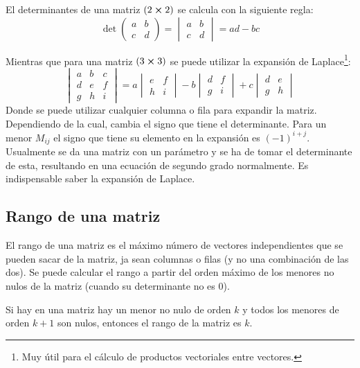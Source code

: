 \documentclass[arial,a4paper,print]{article}
\begin{document}
El determinantes de una matriz $(2\cross2)$ se calcula con la siguiente regla:
\begin{equation*}
	\det \begin{pmatrix} a & b \\
		c & d \end{pmatrix} = 
	\begin{vmatrix} a & b \\
		c & d \end{vmatrix} = ad - bc
\end{equation*}

Mientras que para una matriz $(3\cross3)$ se puede utilizar la expansión de Laplace\footnote{Muy útil para el cálculo de productos vectoriales entre vectores.}:
\begin{equation*}
	\begin{vmatrix}a&b&c\\ d&e&f\\ g&h&i\end{vmatrix} =
	a\begin{vmatrix}e&f\\ h&i\end{vmatrix} - b\begin{vmatrix}d&f\\ g&i\end{vmatrix} + c\begin{vmatrix}d&e\\ g&h\end{vmatrix}
\end{equation*}
Donde se puede utilizar cualquier columna o fila para expandir la matriz. Dependiendo de la cual, cambia el signo que tiene el determinante. Para un menor $M_{ij}$ el signo que tiene su elemento en la expansión es $(-1)^{i+j}$. Usualmente se da una matriz con un parámetro y se ha de tomar el determinante de esta, resultando en una ecuación de segundo grado normalmente. Es indispensable saber la expansión de Laplace. 

\subsection{Rango de una matriz}

El rango de una matriz es el máximo número de vectores independientes que se pueden sacar de la matriz, ja sean columnas o filas (y no una combinación de las dos). Se puede calcular el rango a partir del orden máximo de los menores no nulos de la matriz (cuando su determinante no es $0$).

Si hay en una matriz hay un menor no nulo de orden $k$ y todos los menores de orden $k+1$ son nulos, entonces el rango de la matriz es $k$. 
\end{document}
